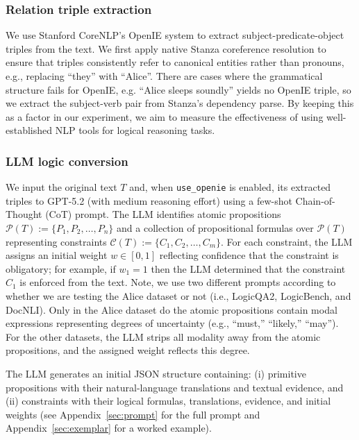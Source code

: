 \documentclass{article} %
\begin{document}
\subsubsection{Relation triple extraction}
We use Stanford CoreNLP's OpenIE system to extract subject-predicate-object triples from the text. We first apply native Stanza coreference resolution to ensure that triples consistently refer to canonical entities rather than pronouns, e.g., replacing ``they'' with ``Alice''. There are cases where the grammatical structure fails for OpenIE, e.g. ``Alice sleeps soundly'' yields no OpenIE triple, so we extract the subject-verb pair from Stanza's dependency parse. 
By keeping this as a factor in our experiment, we aim to measure the effectiveness of using well-established NLP tools for logical reasoning tasks.

\subsubsection{LLM logic conversion}
We input the original text $T$ and, when \texttt{use\_openie} is enabled, its extracted triples to GPT-5.2 (with medium reasoning effort) using a few-shot Chain-of-Thought (CoT) prompt. The LLM identifies atomic propositions $\mathcal{P}(T):=\{P_1, P_2, \dots, P_n\}$ and a collection of propositional formulas over $\mathcal{P}(T)$ representing constraints $\mathcal{C}(T):=\{C_1, C_2, \dots, C_m\}$. For each constraint, the LLM assigns an initial weight $w \in [0,1]$ reflecting confidence that the constraint is obligatory; for example, if $w_1=1$ then the LLM determined that the constraint $C_1$ is enforced from the text. 
Note, we use two different prompts according to whether we are testing the Alice dataset or not (i.e., LogicQA2, LogicBench, and DocNLI). Only in the Alice dataset do the atomic propositions contain modal expressions representing degrees of uncertainty (e.g., ``must,'' ``likely,'' ``may''). For the other datasets, the LLM strips all modality away from the atomic propositions, and the assigned weight reflects this degree. 

The LLM generates an initial JSON structure containing: (i) primitive propositions with their natural-language translations and textual evidence, and (ii) constraints with their logical formulas, translations, evidence, and initial weights (see Appendix~\ref{sec:prompt} for the full prompt and Appendix~\ref{sec:exemplar} for a worked example).
\end{document}
